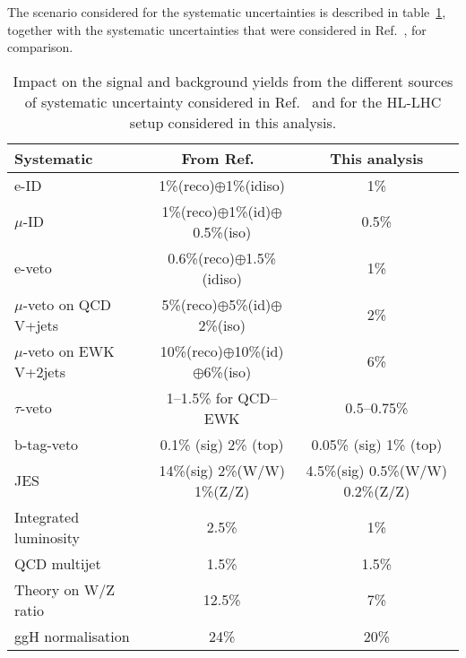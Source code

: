 \documentclass[../report.tex]{subfiles}
\begin{document}
The scenario considered for the systematic uncertainties is described
in table~\ref{tab:systs}, together with the systematic uncertainties that were 
considered in Ref.~\cite{Sirunyan:2018owy}, for comparison.

\begin{table}[ht]
  \centering
  {%
  \begin{tabular}{l|c|c}
    \hline
    Systematic & From Ref.~\cite{Sirunyan:2018owy} & This analysis \\
    \hline
    e-ID & 1\%(reco)$\oplus$1\%(idiso) & 1\% \\
    $\mu$-ID & 1\%(reco)$\oplus$1\%(id)$\oplus$0.5\%(iso) & 0.5\% \\
    \hline
    e-veto & 0.6\%(reco)$\oplus$1.5\%(idiso) & 1\% \\
    $\mu$-veto on QCD V+jets & 5\%(reco)$\oplus$5\%(id)$\oplus$2\%(iso) & 2\% \\
    $\mu$-veto on EWK V+2jets & 10\%(reco)$\oplus$10\%(id)$\oplus$6\%(iso) & 6\% \\
    $\tau$-veto & 1--1.5\% for QCD--EWK  & 0.5--0.75\% \\
    b-tag-veto & 0.1\% (sig) 2\% (top) & 0.05\% (sig) 1\% (top) \\
    \hline
    JES & 14\%(sig) 2\%(W/W) 1\%(Z/Z) & 4.5\%(sig) 0.5\%(W/W) 0.2\%(Z/Z) \\
    Integrated luminosity & 2.5\% & 1\% \\
    QCD multijet & 1.5\%  & 1.5\% \\
    \hline
    Theory on W/Z ratio & 12.5\% & 7\% \\
    ggH normalisation & 24\% & 20\% \\
    \hline
\end{tabular}
    } \caption{Impact on the signal and background yields from the
    different sources of systematic uncertainty considered in
    Ref.~\cite{Sirunyan:2018owy} and for the HL-LHC setup considered
    in this analysis.}  \label{tab:systs}
\end{table}
\end{document}
